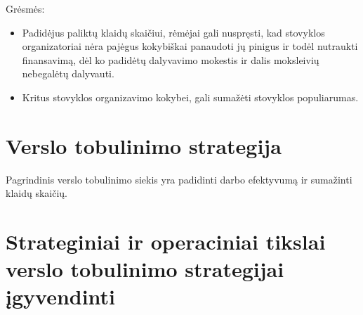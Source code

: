 Grėsmės:
\begin{itemize}
  \item Padidėjus paliktų klaidų skaičiui, rėmėjai gali nuspręsti, kad 
    stovyklos organizatoriai nėra pajėgus kokybiškai panaudoti jų pinigus
    ir todėl nutraukti finansavimą, dėl ko padidėtų dalyvavimo mokestis ir
    dalis moksleivių nebegalėtų dalyvauti.
  \item Kritus stovyklos organizavimo kokybei, gali sumažėti stovyklos
    populiarumas.
\end{itemize}

\section{Verslo tobulinimo strategija}

Pagrindinis verslo tobulinimo siekis yra padidinti darbo efektyvumą ir 
sumažinti klaidų skaičių.

\section{Strateginiai ir operaciniai tikslai verslo tobulinimo %
  strategijai įgyvendinti}


